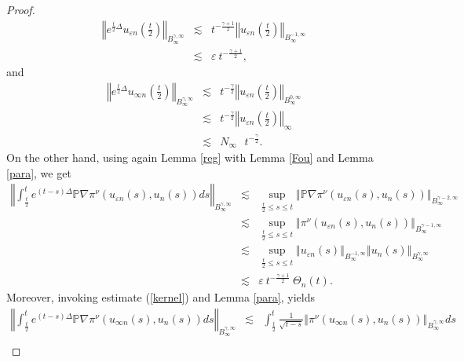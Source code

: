 \documentclass[11pt]{amsart}%
\theoremstyle{plain}
\numberwithin{equation}{section}
\begin{document}
\begin{proof}
\begin{eqnarray}
\left\Vert e^{\frac{t}{2}\Delta }u_{\varepsilon n}(\frac{t}{2})\right\Vert
_{B_{\infty }^{\gamma ,\infty }} &\lesssim &t^{-\frac{\gamma +1}{2}%
}\left\Vert u_{\varepsilon n}(\frac{t}{2})\right\Vert _{B_{\infty
}^{-1,\infty }}  \nonumber \\
&\lesssim &\varepsilon ~t^{-\frac{\gamma +1}{2}},  \label{M1}
\end{eqnarray}%
and
\begin{eqnarray}
\left\Vert e^{\frac{t}{2}\Delta }u_{\infty n}(\frac{t}{2})\right\Vert
_{B_{\infty }^{\gamma ,\infty }} &\lesssim &t^{-\frac{\gamma }{2}}\left\Vert
u_{\varepsilon n}(\frac{t}{2})\right\Vert _{B_{\infty }^{0,\infty }}
\nonumber \\
&\lesssim &t^{-\frac{\gamma }{2}}\left\Vert u_{\varepsilon n}(\frac{t}{2}%
)\right\Vert _{\infty }  \nonumber \\
&\lesssim &N_{\infty }\text{ }t^{-\frac{\gamma }{2}}.  \label{M3}
\end{eqnarray}%
On the other hand, using again Lemma \ref{reg} with Lemma \ref{Fou} and Lemma \ref{para}, we get
\begin{eqnarray}
\left\Vert \int_{\frac{t}{2}}^{t}e^{(t-s)\Delta }\mathbb{P}\nabla \pi ^{\nu
}(u_{\varepsilon n}(s),u_{n}(s))ds\right\Vert _{B_{\infty }^{\gamma ,\infty
}} &\lesssim &\sup_{\frac{t}{2}\leq s\leq t}\left\Vert \mathbb{P}\nabla \pi
^{\nu }(u_{\varepsilon n}(s),u_{n}(s))\right\Vert _{B_{\infty }^{\gamma
-2,\infty }}  \nonumber \\
&\lesssim &\sup_{\frac{t}{2}\leq s\leq t}\left\Vert \pi ^{\nu
}(u_{\varepsilon n}(s),u_{n}(s))\right\Vert _{B_{\infty }^{\gamma -1,\infty
}}  \nonumber \\
&\lesssim &\sup_{\frac{t}{2}\leq s\leq t}\left\Vert u_{\varepsilon
n}(s)\right\Vert _{B_{\infty }^{-1,\infty }}\left\Vert u_{n}(s)\right\Vert
_{B_{\infty }^{\gamma ,\infty }}  \nonumber \\
&\lesssim &\varepsilon ~t^{-\frac{\gamma +1}{2}}~\Theta _{n}(t).  \label{M4}
\end{eqnarray}%
Moreover, invoking estimate (\ref{kernel}) and Lemma \ref{para}, yields
\begin{eqnarray}
\left\Vert \int_{\frac{t}{2}}^{t}e^{(t-s)\Delta }\mathbb{P}\nabla \pi ^{\nu
}(u_{\infty n}(s),u_{n}(s))ds\right\Vert _{B_{\infty }^{\gamma ,\infty }}
&\lesssim &\int_{\frac{t}{2}}^{t}\frac{1}{\sqrt{t-s}}\left\Vert \pi ^{\nu
}(u_{\infty n}(s),u_{n}(s))\right\Vert _{B_{\infty }^{\gamma ,\infty }}ds
\nonumber \\

\end{eqnarray}
\end{proof}
\end{document}
